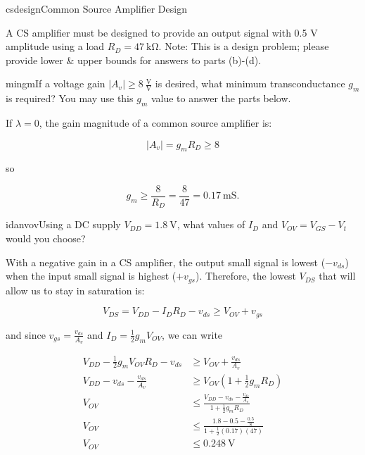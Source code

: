 \begin{mainquestion}{csdesign}{Common Source Amplifier Design}

A CS amplifier must be designed to provide an output signal with 0.5 V amplitude using a load $R_{D} = \qty{47}{\kilo\ohm}$. Note: This is a design problem; please provide lower \& upper bounds for answers to parts (b)-(d).

\begin{partquestion}{mingm}{If a voltage gain $\left|A_{v}\right| \geq 8\ \frac{\text{V}}{\text{V}}$ is desired, what minimum transconductance $g_{m}$ is required? You may use this $g_{m}$ value to answer the parts below.}
\begin{answer}
If $\lambda = 0$, the gain magnitude of a common source amplifier is:

\[
\left|A_{v}\right| = g_{m} R_{D} \geq 8
\]

so

\[
g_{m} \geq \frac{8}{R_{D}} = \frac{8}{47} = \qty{0.17}{\milli\siemens}.
\]
\end{answer}
\end{partquestion}

\begin{partquestion}{idanvov}{Using a DC supply $V_{DD} = \qty{1.8}{\volt}$, what values of $I_{D}$ and $V_{OV} = V_{GS} - V_{t}$ would you choose?}
\begin{answer}
With a negative gain in a CS amplifier, the output small signal is lowest ($-v_{ds}$) when the input small signal is highest ($+v_{gs}$). Therefore, the lowest $V_{DS}$ that will allow us to stay in saturation is:

\[
V_{DS} = V_{DD} - I_{D} R_{D} - v_{ds} \geq V_{OV} + v_{gs}
\]

and since $v_{gs} = \frac{v_{ds}}{A_{v}}$ and $I_{D} = \frac{1}{2}g_{m}V_{OV}$, we can write

\begin{align*}
V_{DD} - \frac{1}{2}g_{m}V_{OV}R_{D} - v_{ds} &\geq V_{OV} + \frac{v_{ds}}{A_{v}} \\
V_{DD} - v_{ds} - \frac{v_{ds}}{A_{v}} &\geq V_{OV}\left(1 + \frac{1}{2}g_{m}R_{D}\right) \\
V_{OV} &\leq \frac{V_{DD} - v_{ds} - \frac{v_{ds}}{A_{v}}}{1 + \frac{1}{2}g_{m}R_{D}}\\
V_{OV} &\leq \frac{1.8 - 0.5 - \frac{0.5}{8}}{1 + \frac{1}{2}(0.17)(47)}\\
V_{OV} &\leq \qty{0.248}{\volt}
\end{align*}


\end{answer}
\end{partquestion}
\end{mainquestion}
